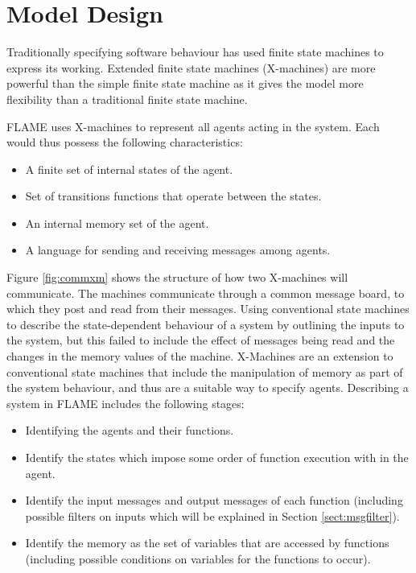 \section{Model Design}\label{chap:design}
\label{model_design}

Traditionally specifying software behaviour has used finite state
machines to express its working. Extended finite state machines (X-machines) are more
powerful than the simple finite state machine as it gives the model more flexibility than a traditional finite state machine. 

FLAME uses X-machines to represent all agents acting in the system. Each would thus possess the following characteristics:

\begin{itemize}
\item A finite set of internal states of the agent.
\item Set of transitions functions that operate between the states.
\item An internal memory set of the agent.
\item A language for sending and receiving messages among agents.
\end{itemize}

Figure \ref{fig:commxm} shows the structure of how two X-machines will communicate. The machines communicate through a common message board, to which they post and read from their messages.
Using conventional state machines to describe the state-dependent behaviour
of a system by outlining the inputs to the system, but this failed to include the
effect of messages being read and the changes in the memory values of the machine. X-Machines are an extension to conventional state
machines that include the manipulation of memory as part of the
system behaviour, and thus are a suitable way to specify agents.
Describing a system in FLAME includes the following stages:

\begin{itemize}
\item Identifying the agents and their functions.
\item Identify the states which impose some order of function
execution with in the agent.
\item Identify the input messages and output messages of each function
(including possible filters on inputs which will be explained in Section \ref{sect:msgfilter}).
\item Identify the memory as the set of variables that are accessed by
functions (including possible conditions on variables for the
functions to occur).
\end{itemize}



